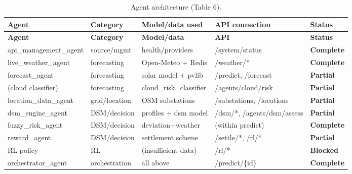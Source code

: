 \documentclass[11pt,a4paper]{article}
\newcommand{\stC}{\textcolor{cok}{\textbf{Complete}}}
\newcommand{\stP}{\textcolor{cpart}{\textbf{Partial}}}
\newcommand{\stB}{\textcolor{cmiss}{\textbf{Blocked}}}
\begin{document}
\begin{footnotesize}
\begin{longtable}{@{}p{2.7cm}p{1.9cm}p{2.9cm}p{2.6cm}l@{}}
\caption{Agent architecture (Table 6).}\label{tab:agents}\\
\toprule
\textbf{Agent} & \textbf{Category} & \textbf{Model/data used} & \textbf{API connection} & \textbf{Status}\\
\midrule\endfirsthead
\toprule \textbf{Agent} & \textbf{Category} & \textbf{Model/data} & \textbf{API} & \textbf{Status}\\ \midrule\endhead
\bottomrule\endfoot
api\_management\_agent & source/mgmt & health/providers & /system/status & \stC\\
live\_weather\_agent & forecasting & Open-Meteo + Redis & /weather/* & \stC\\
forecast\_agent & forecasting & solar model + pvlib & /predict, /forecast & \stP\\
(cloud classifier) & forecasting & cloud\_risk\_classifier & /agents/cloud/risk & \stP\\
location\_data\_agent & grid/location & OSM substations & /substations, /locations & \stP\\
dsm\_engine\_agent & DSM/decision & profiles + dsm model & /dsm/*, /agents/dsm/assess & \stP\\
fuzzy\_risk\_agent & DSM/decision & deviation+weather & (within predict) & \stC\\
reward\_agent & DSM/decision & settlement scheme & /settle/*, /rl/* & \stP\\
RL policy & RL & (insufficient data) & /rl/* & \stB\\
orchestrator\_agent & orchestration & all above & /predict/\{id\} & \stC\\
\end{longtable}
\end{footnotesize}

\end{document}
